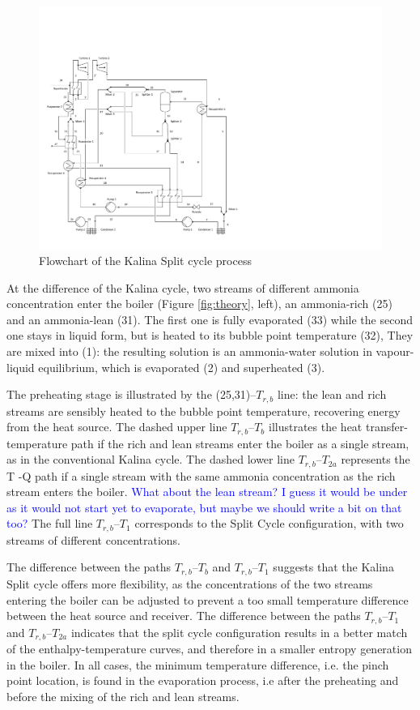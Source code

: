 \documentclass[final,times,3p]{elsarticle}
\begin{document}
\begin{figure}[htbp]
\centering
\includegraphics[width=1.0\linewidth]{Drawing_Kalina_Split.pdf}
\caption{Flowchart of the Kalina Split cycle process}
\label{fig:split_cycle}
\end{figure}

At the difference of the Kalina cycle, two streams of different ammonia concentration enter the boiler (Figure \ref{fig:theory}, left), an ammonia-rich (25) and an ammonia-lean (31). The first one is fully evaporated (33) while the second one stays in liquid form, but is heated to its bubble point temperature (32), They are mixed into (1): the resulting solution is an ammonia-water solution in vapour-liquid equilibrium, which is evaporated (2) and superheated (3). 

The preheating stage is illustrated by the (25,31)--$T_{r,b}$ line: the lean and rich streams are sensibly heated to the bubble point temperature, recovering energy from the heat source. The dashed upper line $T_{r,b}$--$T_b$ illustrates the heat transfer-temperature path if the rich and lean streams enter the boiler as a single stream, as in the conventional Kalina cycle. The dashed lower line $T_{r,b}$--$T_{2a}$ represents the T -Q path if a single stream with the same ammonia concentration as the rich stream enters the boiler. \textcolor{blue}{What about the lean stream? I guess it would be under as it would not start yet to evaporate, but maybe we should write a bit on that too?} The full line $T_{r,b}$--$T_{1}$ corresponds to the Split Cycle configuration, with two streams of different concentrations. 

The difference between the paths $T_{r,b}$--$T_b$ and $T_{r,b}$--$T_{1}$ suggests that the Kalina Split cycle offers more flexibility, as the concentrations of the two streams entering the boiler can be adjusted to prevent a too small temperature difference between the heat source and receiver. The difference between the paths $T_{r,b}$--$T_{1}$ and $T_{r,b}$--$T_{2a}$ indicates that the split cycle configuration results in a better match of the enthalpy-temperature curves, and therefore in a smaller entropy generation in the boiler. In all cases, the minimum temperature difference, i.e. the pinch point location, is found in the evaporation process, i.e after the preheating and before the mixing of the rich and lean streams. 
\end{document}
